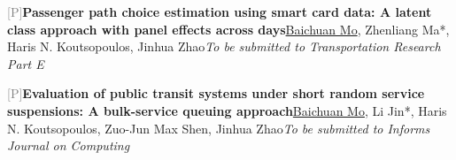 \par\noindent\begin{minipage}{\linewidth}
{\textcolor{gray}{[P\themyPrePrint]\;}}{\textbf{Passenger path choice estimation using smart card data: A latent class approach with panel effects across days}}{\newline \underline{Baichuan Mo}, Zhenliang Ma*, Haris N. Koutsopoulos, Jinhua Zhao}{\newline \emph{To be submitted to Transportation Research Part E}}{{}}{}
\end{minipage}\par\vspace{5.5pt}


\par\noindent\begin{minipage}{\linewidth}
{\textcolor{gray}{[P\themyPrePrint]\;}}{\textbf{Evaluation of public transit systems under short random service suspensions: A bulk-service queuing approach}}{\newline \underline{Baichuan Mo}, Li Jin*, Haris N. Koutsopoulos, Zuo-Jun Max Shen, Jinhua Zhao}{\newline \emph{To be submitted to Informs Journal on Computing}}{{}}{}
\end{minipage}\par\vspace{5.5pt}


